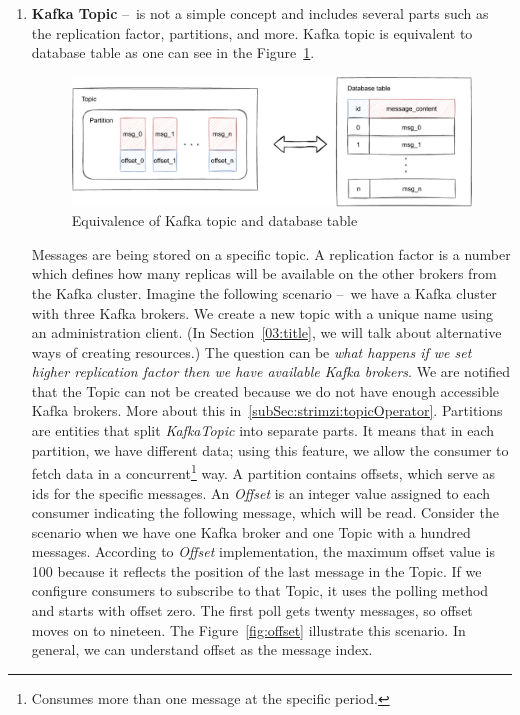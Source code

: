\begin{enumerate}
    \item \textbf{Kafka Topic} \---\ is not a simple concept and includes several parts such as the replication factor, partitions, and more.
    Kafka topic is equivalent to database table as one can see in the Figure~\ref{fig:topicAndDatabaseTable}.
    \begin{figure}[!ht]
        \centering
        \includegraphics[scale=0.80]{obrazky-figures/02-preliminaries/02-kafka/03-database-relation}
        \caption{Equivalence of Kafka topic and database table}
        \label{fig:topicAndDatabaseTable}
    \end{figure}

    Messages are being stored on a specific topic.
    A replication factor is a number which defines how many replicas will be available on the other brokers from the Kafka cluster.
    Imagine the following scenario \---\ we have a Kafka cluster with three Kafka brokers.
    We create a new topic with a unique name using an administration client. (In Section~\ref{03:title}, we will talk about alternative ways of creating resources.) The question can be \emph{what happens if we set higher replication factor then we have available Kafka brokers}.
    We are notified that the Topic can not be created because we do not have enough accessible Kafka brokers.
    More about this in~\ref{subSec:strimzi:topicOperator}.
    Partitions are entities that split \emph{KafkaTopic} into separate parts.
    It means that in each partition, we have different data; using this feature, we allow the consumer to fetch data in a concurrent\footnote{Consumes more than one message at the specific period.} way.
    A partition contains offsets, which serve as ids for the specific messages.
    An \emph{Offset} is an integer value assigned to each consumer indicating the following message, which will be read.
    Consider the scenario when we have one Kafka broker and one Topic with a hundred messages.
    According to \emph{Offset}  implementation, the maximum offset value is 100 because it reflects the position of the last message in the Topic.
    If we configure consumers to subscribe to that Topic, it uses the polling method and starts with offset zero.
    The first poll gets twenty messages, so offset moves on to nineteen. The Figure~\ref{fig:offset} illustrate this scenario.
    In general, we can understand offset as the message index.


\end{enumerate}
